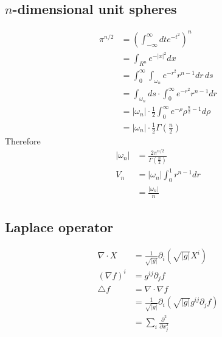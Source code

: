 \documentclass[10pt,a4paper]{article}
\theoremstyle{definition}
\begin{document}
\subsection{\texorpdfstring{$n$}{TEXT}-dimensional unit spheres}
\begin{align}
    \pi^{n/2}
    &=\left(\int_{-\infty}^\infty dt e^{-t^2}\right)^n\\
    &=\int_{R^n} e^{-|x|^2}dx\\
    &=\int_0^\infty\int_{\omega_n}e^{-r^2}r^{n-1}dr\,ds\\
    &=\int_{\omega_n}ds\cdot\int_0^\infty e^{-r^2}r^{n-1}dr\\
    &=|\omega_n|\cdot\frac{1}{2}\int_0^\infty e^{-\rho}\rho^{\frac{n}{2}-1}d\rho\\
    &=|\omega_n|\cdot\frac{1}{2}\Gamma\left(\frac{n}{2}\right)
\end{align}
Therefore
\begin{align}
|\omega_n| &= \frac{2\pi^{n/2}}{\Gamma\left(\frac{n}{2}\right)}\\
V_n 
&=|\omega_n|\int_0^1r^{n-1}dr\\
&=\frac{|\omega_n|}{n}
\end{align}

\subsection{Laplace operator}
\begin{align}
    \nabla\cdot X&=\frac{1}{\sqrt{|g|}}\partial_i\left(\sqrt{|g|}X^i\right)\\
    (\nabla f)^i&=g^{ij}\partial_jf\\
    \triangle f &= \nabla\cdot\nabla f\\
    &=\frac{1}{\sqrt{|g|}}\partial_i\left(\sqrt{|g|} g^{ij}\partial_jf \right)\\
    &= \sum_i \frac{\partial^2}{\partial x_j^2}
\end{align}
\end{document}
